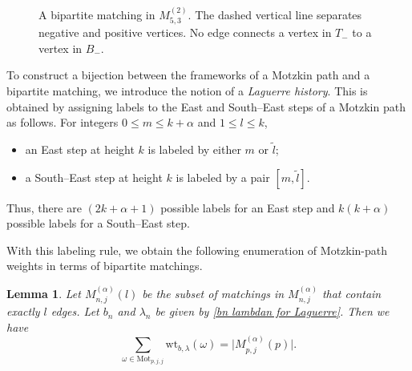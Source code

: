\documentclass{amsart}
\theoremstyle{plain}
\newtheorem{lem}[thm]{Lemma}
\theoremstyle{remark}
\numberwithin{equation}{section}
\begin{document}
\begin{figure}[h]
    \centering
    \caption{A bipartite matching in $M_{5,3}^{(2)}$. The dashed vertical line separates negative and positive vertices. No edge connects a vertex in $T_{-}$ to a vertex in $B_{-}$.}
    \label{fig:bipartite matching}
\end{figure}

To construct a bijection between the frameworks of a Motzkin path and 
a bipartite matching, we introduce the notion of a \emph{Laguerre history}. 
This is obtained by assigning labels to the East and South--East steps 
of a Motzkin path as follows. 
For integers $0 \le m \le k+\alpha$ and $1 \le l \le k$,
\begin{itemize}
    \item an East step at height $k$ is labeled by either $m$ or $\widetilde{l}$;
    \smallskip 
    \item a South--East step at height $k$ is labeled by a pair 
    $[m,\widetilde{l}]$.
\end{itemize} 
Thus, there are $(2k+\alpha+1)$ possible labels for an East step and 
$k(k+\alpha)$ possible labels for a South--East step.

With this labeling rule, we obtain the following enumeration of 
Motzkin-path weights in terms of bipartite matchings.

\begin{lem} \label{Lem_Laguerre history bijection}
Let $M_{n,j}^{(\alpha)}(l)$ be the subset of matchings in $M_{n,j}^{(\alpha)}$ 
that contain exactly $l$ edges. Let $b_n$ and $\lambda_n$ be given by \eqref{bn lambdan for Laguerre}. Then we have
    \begin{equation} \label{eqn in Lem Laguerre history}
       \sum_{\omega\in\mathrm{Mot}_{p,j,j}}\mathrm{wt}_{b,\lambda}(\omega) =  \Big|M_{p,j}^{(\alpha)}(p)\Big| .
    \end{equation}
\end{lem}
\end{document}
